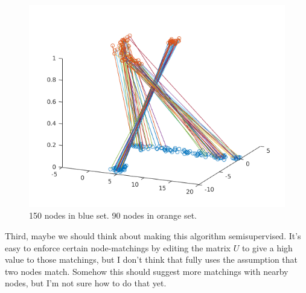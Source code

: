 \documentclass[12pt]{article}
\begin{document}
\begin{figure}
  \centering
  \includegraphics[width=15cm]{graphmatch2.png}
  \caption{150 nodes in blue set. 90 nodes in orange set.}
  \label{fig:graphmatch2}
\end{figure}

Third, maybe we should think about making this algorithm semisupervised. It's easy to enforce certain node-matchings by editing the matrix $U$ to give a high value to those matchings, but I don't think that fully uses the assumption that two nodes match. Somehow this should suggest more matchings with nearby nodes, but I'm not sure how to do that yet.
\end{document}
